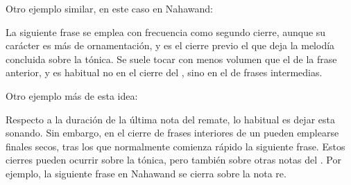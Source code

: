 Otro ejemplo similar, en este caso en \maqam Nahawand:


\begin{center}
\end{center}



La siguiente frase se emplea con frecuencia como segundo cierre, aunque su carácter es más de ornamentación, y es el cierre previo el que deja la melodía concluida sobre la tónica. Se suele tocar con menos volumen que el de la frase anterior, y es habitual no en el cierre del \taqsimb, sino en el de frases intermedias.


\begin{center}
\end{center}


Otro ejemplo más de esta idea:


\begin{center}
\end{center}


Respecto a la duración de la última nota del remate, lo habitual es dejar esta sonando. Sin embargo, en el cierre de frases interiores de un \taqsim pueden emplearse finales secos, tras los que normalmente comienza rápido la siguiente frase. Estos cierres pueden ocurrir sobre la tónica, pero también sobre otras notas del \maqamb. Por ejemplo, la siguiente frase en \maqam Nahawand se cierra sobre la nota re.


